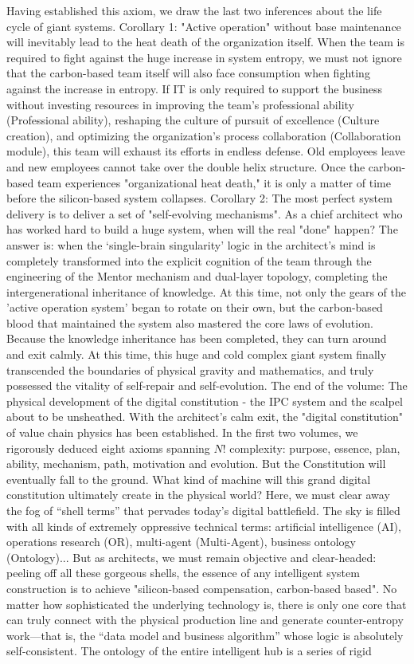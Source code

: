 \documentclass[11pt,a4paper]{article}
\begin{document}
Having established this axiom, we draw the last two inferences about the life cycle of giant systems. Corollary 1: "Active operation" without base maintenance will inevitably lead to the heat death of the organization itself. When the team is required to fight against the huge increase in system entropy, we must not ignore that the carbon-based team itself will also face consumption when fighting against the increase in entropy. If IT is only required to support the business without investing resources in improving the team's professional ability (Professional ability), reshaping the culture of pursuit of excellence (Culture creation), and optimizing the organization's process collaboration (Collaboration module), this team will exhaust its efforts in endless defense. Old employees leave and new employees cannot take over the double helix structure. Once the carbon-based team experiences "organizational heat death," it is only a matter of time before the silicon-based system collapses. Corollary 2: The most perfect system delivery is to deliver a set of "self-evolving mechanisms". As a chief architect who has worked hard to build a huge system, when will the real "done" happen? The answer is: when the ‘single-brain singularity’ logic in the architect’s mind is completely transformed into the explicit cognition of the team through the engineering of the Mentor mechanism and dual-layer topology, completing the intergenerational inheritance of knowledge. At this time, not only the gears of the 'active operation system' began to rotate on their own, but the carbon-based blood that maintained the system also mastered the core laws of evolution. Because the knowledge inheritance has been completed, they can turn around and exit calmly. At this time, this huge and cold complex giant system finally transcended the boundaries of physical gravity and mathematics, and truly possessed the vitality of self-repair and self-evolution. The end of the volume: The physical development of the digital constitution - the IPC system and the scalpel about to be unsheathed. With the architect's calm exit, the "digital constitution" of value chain physics has been established. In the first two volumes, we rigorously deduced eight axioms spanning $N!$ complexity: purpose, essence, plan, ability, mechanism, path, motivation and evolution. But the Constitution will eventually fall to the ground. What kind of machine will this grand digital constitution ultimately create in the physical world? Here, we must clear away the fog of “shell terms” that pervades today’s digital battlefield. The sky is filled with all kinds of extremely oppressive technical terms: artificial intelligence (AI), operations research (OR), multi-agent (Multi-Agent), business ontology (Ontology)... But as architects, we must remain objective and clear-headed: peeling off all these gorgeous shells, the essence of any intelligent system construction is to achieve "silicon-based compensation, carbon-based based". No matter how sophisticated the underlying technology is, there is only one core that can truly connect with the physical production line and generate counter-entropy work—that is, the “data model and business algorithm” whose logic is absolutely self-consistent. The ontology of the entire intelligent hub is a series of rigid 
\end{document}
